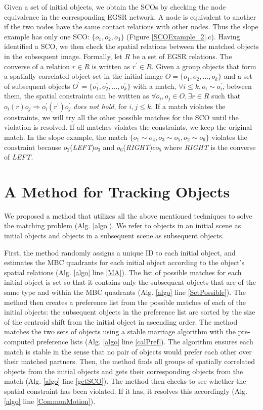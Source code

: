 \documentclass[letterpaper]{article}
\begin{document}
Given a set of initial objects, we obtain the SCOs by checking the node equivalence in the corresponding EGSR network. A node is equivalent to another if the two nodes have the same contact relations with other nodes. Thus the slope example has only one SCO: $\{o_1, o_2, o_3\}$ (Figure \ref{SCOExample_2}.c). Having identified a SCO, we then check the spatial relations between the matched objects in the subsequent image. Formally, let $R$ be a set of EGSR relations. The converse of a relation $r \in R$ is written as $r^{\prime} \in R$. Given a group objects that form a spatially correlated object set in the initial image $O = \{o_1, o_2, ... , o_k\}$ and a set of subsequent objects $O^\prime = \{o^{\prime}_1, o^{\prime}_2, ..., o^{\prime}_k \}$ with a match, $\forall i\leq k, o_i \sim o^{\prime}_i$, between them, the spatial constraints can be written as $\forall o_i,o_j\in O, \exists r\in R$ such that $o_i (r) o_j \Rightarrow o^{\prime}_i (r^{\prime}) o^{\prime}_j$ \emph{does not hold}, for $i,j \leq k$. If a match violates the constraints, we will try all the other possible matches for the SCO until the violation is resolved. If all matches violates the constraints, we keep the original match. In the slope example, the match $\{o_1\sim o_4, o_3\sim o_5, o_2 \sim o_6\}$ violates the constraint because $o_2$(\emph{LEFT})$o_3$ and $o_6$(\emph{RIGHT})$co_5$ where \emph{RIGHT} is the converse of \emph{LEFT}.




\section{A Method for Tracking Objects}

We proposed a method that utilizes all the above mentioned techniques to solve the matching problem (Alg. \ref{algo}). We refer to objects in an initial scene as initial objects and objects in a subsequent scene as subsequent objects.

First, the method randomly assigns a unique ID to each initial object, and estimates the MBC quadrants for each initial object according to the object's spatial relations (Alg. \ref{algo} line \ref{MA}). The list of possible matches for each initial object is set so that it contains only the subsequent objects that are of the same type and within the MBC quadrants (Alg. \ref{algo} line \ref{SetPossible}). The method then creates a preference list from the possible matches of each of the initial objects: the subsequent objects in the preference list are sorted by the size of the centroid shift from the initial object in ascending order. The method matches the two sets of objects using a stable marriage algorithm \cite{gale1962college} with the pre-computed preference lists (Alg. \ref{algo} line \ref{calPref}). The algorithm ensures each match is stable in the sense that no pair of objects would prefer each other over their matched partners. Then, the method finds all groups of spatially correlated objects from the initial objects and gets their corresponding objects from the match (Alg. \ref{algo} line \ref{getSCO}). The method then checks to see whether the spatial constraint  has been violated. If it has, it resolves this accordingly (Alg. \ref{algo} line \ref{CommonMotion}).
\end{document}
